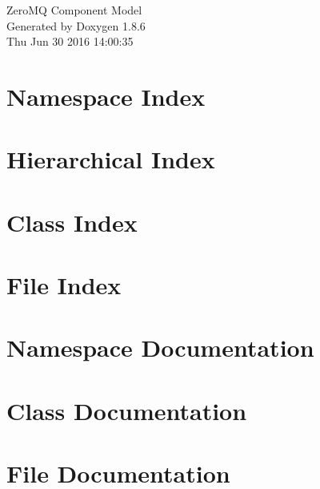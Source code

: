 \documentclass[twoside]{book}
\newcommand{\clearemptydoublepage}{%
  \newpage{\pagestyle{empty}\cleardoublepage}%
}
\begin{document}
\hypersetup{pageanchor=false}
\begin{titlepage}
\vspace*{7cm}
\begin{center}%
{\Large Zero\-M\-Q Component Model }\\
\vspace*{1cm}
{\large Generated by Doxygen 1.8.6}\\
\vspace*{0.5cm}
{\small Thu Jun 30 2016 14:00:35}\\
\end{center}
\end{titlepage}
\clearemptydoublepage
\tableofcontents
\clearemptydoublepage
{}
\hypersetup{pageanchor=true}

\chapter{Namespace Index}

\chapter{Hierarchical Index}

\chapter{Class Index}

\chapter{File Index}

\chapter{Namespace Documentation}

\chapter{Class Documentation}













\chapter{File Documentation}



















\newpage
{}
{}
\printindex
\end{document}
